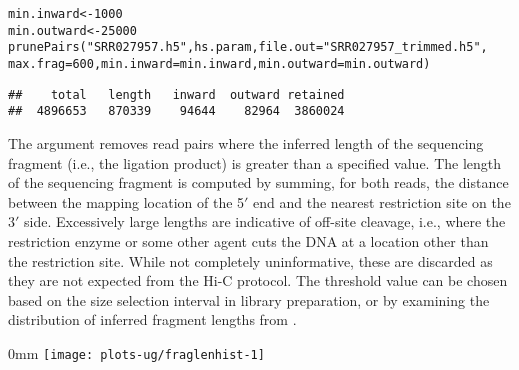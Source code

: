 \documentclass{report}\usepackage[]{graphicx}\usepackage[usenames,dvipsnames]{color}
\makeatletter
\def\maxwidth{ %
  \ifdim\Gin@nat@width>\linewidth
    \linewidth
  \else
    \Gin@nat@width
  \fi
}
\newcommand{\hlnum}[1]{\textcolor[rgb]{0.816,0.125,0.439}{#1}}%
\newcommand{\hlstr}[1]{\textcolor[rgb]{0.251,0.627,0.251}{#1}}%
\newcommand{\hlopt}[1]{\textcolor[rgb]{0,0,0}{#1}}%
\newcommand{\hlstd}[1]{\textcolor[rgb]{0.251,0.251,0.251}{#1}}%
\newcommand{\hlkwb}[1]{\textcolor[rgb]{0,0,0}{#1}}%
\newcommand{\hlkwc}[1]{\textcolor[rgb]{0.251,0.251,0.251}{#1}}%
\newcommand{\hlkwd}[1]{\textcolor[rgb]{0.878,0.439,0.125}{#1}}%
\newenvironment{knitrout}{}{} %
\makeatother
\begin{document}
\begin{knitrout}
\color{fgcolor}\begin{kframe}
\begin{alltt}
\hlstd{min.inward} \hlkwb{<-} \hlnum{1000}
\hlstd{min.outward} \hlkwb{<-} \hlnum{25000}
\hlkwd{prunePairs}\hlstd{(}\hlstr{"SRR027957.h5"}\hlstd{, hs.param,} \hlkwc{file.out}\hlstd{=}\hlstr{"SRR027957_trimmed.h5"}\hlstd{,}
           \hlkwc{max.frag}\hlstd{=}\hlnum{600}\hlstd{,} \hlkwc{min.inward}\hlstd{=min.inward,} \hlkwc{min.outward}\hlstd{=min.outward)}
\end{alltt}
\begin{verbatim}
##    total   length   inward  outward retained 
##  4896653   870339    94644    82964  3860024
\end{verbatim}
\end{kframe}
\end{knitrout}

The  argument removes read pairs where the inferred length of the sequencing fragment (i.e., the ligation product) is greater than a specified value.
The length of the sequencing fragment is computed by summing, for both reads, the distance between the mapping location of the 5$'$ end and the nearest restriction site on the 3$'$ side.
Excessively large lengths are indicative of off-site cleavage, i.e., where the restriction enzyme or some other agent cuts the DNA at a location other than the restriction site.
While not completely uninformative, these are discarded as they are not expected from the Hi-C protocol.
The threshold value can be chosen based on the size selection interval in library preparation, or by examining the distribution of inferred fragment lengths from .

\begin{knitrout}
\color{fgcolor}\begin{adjustwidth}{\fltoffset}{0mm}
\texttt{[image: plots-ug/fraglenhist-1]} \end{adjustwidth}
\end{knitrout}
\end{document}
